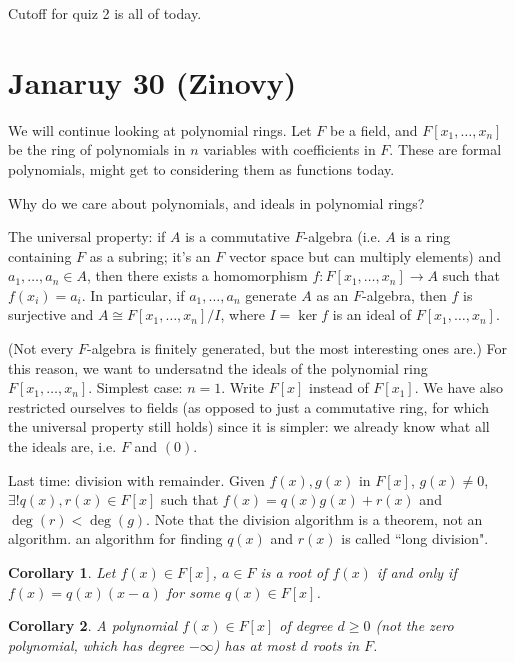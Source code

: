 \documentclass{article}
\theoremstyle{plain}
\newtheorem{corollary}{Corollary}
\theoremstyle{remark}
\begin{document}
Cutoff for quiz 2 is all of today.

\section{Janaruy 30 (Zinovy)}
We will continue looking at polynomial rings.
Let $F$ be a field, and $F[x_1,\dots,x_n]$ be the ring of polynomials
in $n$ variables with coefficients in $F$.
These are formal polynomials, might get to considering them as functions today.

Why do we care about polynomials, and ideals in polynomial rings?
\begin{center}
	The universal property: if $A$ is a commutative $F$-algebra
	(i.e. $A$ is a ring containing $F$ as a subring;
	it's an $F$ vector space but can multiply elements)
	and $a_1,\dots,a_n \in A$, then there exists a homomorphism
	$f \colon F[x_1,\dots,x_n] \to A$ such that $f(x_i) = a_i$.
	In particular, if $a_1,\dots,a_n$ generate $A$ as an $F$-algebra,
	then $f$ is surjective and $A \cong F[x_1,\dots,x_n]/I$,
	where $I = \ker{f}$ is an ideal of $F[x_1,\dots,x_n]$.
\end{center}
(Not every $F$-algebra is finitely generated,
but the most interesting ones are.)
For this reason, we want to undersatnd the ideals of the polynomial ring
$F[x_1,\dots,x_n]$.
Simplest case: $n=1$. Write $F[x]$ instead of $F[x_1]$.
We have also restricted ourselves to fields
(as opposed to just a commutative ring, for which the universal property still holds)
since it is simpler: we already know what all the ideals are, i.e. $F$ and $(0)$.

Last time: division with remainder.
Given $f(x),g(x)$ in $F[x]$, $g(x) \neq 0$,
$\exists! q(x),r(x) \in F[x]$ such that $f(x) = q(x)g(x) + r(x)$
and $\deg(r) < \deg(g)$.
Note that the division algorithm is a theorem, not an algorithm.
an algorithm for finding $q(x)$ and $r(x)$ is called ``long division".

\begin{corollary}
	Let $f(x) \in F[x]$, $a \in F$ is a root of $f(x)$
	if and only if $f(x) = q(x)(x-a)$ for some $q(x) \in F[x]$.
\end{corollary}
\begin{corollary}
	A polynomial $f(x) \in F[x]$ of degree $d \geq 0$
	(not the zero polynomial, which has degree $-\infty$)
	has at most $d$ roots in $F$.
\end{corollary}
\end{document}
